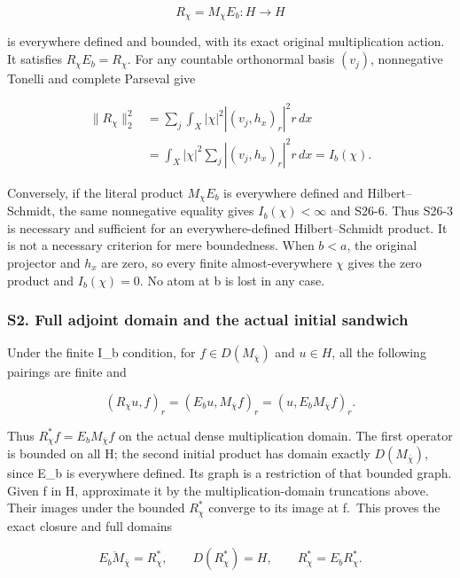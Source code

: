 \documentclass[
  11pt,
]{article}
\makeatletter
\let\ReaderOriginalAnchorStart\hyper@anchorstart
\let\ReaderOriginalAnchorEnd\hyper@anchorend
\let\ReaderPendingAliases\@empty
\def\ReaderArmAliases#1{\gdef\ReaderPendingAliases{#1}}
\def\hyper@anchorstart#1{\ReaderIfNativeAnchorTF{#1}{\ReaderPendingAliases\global\let\ReaderPendingAliases\@empty}{}\ReaderOriginalAnchorStart{#1}}
\makeatother
\begin{document}
\[
R_\chi=M_\chi E_b:H\longrightarrow H
\tag{S26-5}
\]

is everywhere defined and bounded, with its exact original
multiplication action. It satisfies \(R_\chi E_b=R_\chi\). For any
countable orthonormal basis \((v_j)\), nonnegative Tonelli and complete
Parseval give

\[
\begin{aligned}
\|R_\chi\|_2^2
&=\sum_j\int_X|\chi|^2|(v_j,h_x)_r|^2r\,dx\\
&=\int_X|\chi|^2\sum_j|(v_j,h_x)_r|^2r\,dx
=I_b(\chi).
\end{aligned}
\tag{S26-6}
\]

Conversely, if the literal product \(M_\chi E_b\) is everywhere defined
and Hilbert--Schmidt, the same nonnegative equality gives
\(I_b(\chi)<\infty\) and S26-6. Thus S26-3 is necessary and sufficient
for an everywhere-defined Hilbert--Schmidt product. It is not a
necessary criterion for mere boundedness. When \(b<a\), the original
projector and \(h_x\) are zero, so every finite almost-everywhere
\(\chi\) gives the zero product and \(I_b(\chi)=0\). No atom at b is
lost in any case.

\ReaderArmAliases{\ReaderOriginalAnchorStart{s2.-full-adjoint-domain-and-the-actual-initial-sandwich}\ReaderOriginalAnchorEnd}
\subsubsection{S2. Full adjoint domain and the actual initial
sandwich}\label{s2.-full-adjoint-domain-and-the-actual-initial-sandwich}

Under the finite I\_b condition, for \(f\in D(M_{\overline\chi})\) and
\(u\in H\), all the following pairings are finite and

\[
(R_\chi u,f)_r
=(E_bu,M_{\overline\chi}f)_r
=(u,E_bM_{\overline\chi}f)_r.
\tag{S26-7}
\]

Thus \(R_\chi^*f=E_bM_{\overline\chi}f\) on the actual dense
multiplication domain. The first operator is bounded on all H; the
second initial product has domain exactly \(D(M_{\overline\chi})\),
since E\_b is everywhere defined. Its graph is a restriction of that
bounded graph. Given f in H, approximate it by the multiplication-domain
truncations above. Their images under the bounded \(R_\chi^*\) converge
to its image at f.~This proves the exact closure and full domains

\[
\overline{E_bM_{\overline\chi}}=R_\chi^*,\qquad
D(R_\chi^*)=H,\qquad R_\chi^*=E_bR_\chi^*.
\tag{S26-8}
\]
\end{document}
